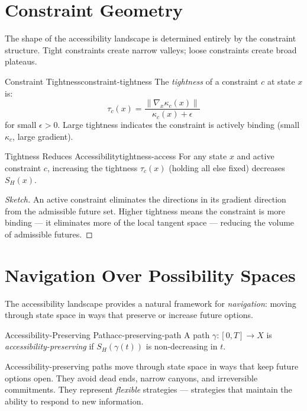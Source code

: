 \section{Constraint Geometry}

The shape of the accessibility landscape is determined entirely by the
constraint structure. Tight constraints create narrow valleys; loose
constraints create broad plateaus.

\begin{definition}{Constraint Tightness}{constraint-tightness}
  The \emph{tightness} of a constraint $c$ at state $x$ is:
  \[
    \tau_c(x) = \frac{\|\nabla_x \kappa_c(x)\|}{\kappa_c(x) + \epsilon}
  \]
  for small $\epsilon > 0$. Large tightness indicates the constraint is
  actively binding (small $\kappa_c$, large gradient).
\end{definition}

\begin{proposition}{Tightness Reduces Accessibility}{tightness-access}
  For any state $x$ and active constraint $c$, increasing the tightness
  $\tau_c(x)$ (holding all else fixed) decreases $S_H(x)$.
\end{proposition}

\begin{proof}[Sketch]
  An active constraint eliminates the directions in its gradient direction
  from the admissible future set. Higher tightness means the constraint
  is more binding — it eliminates more of the local tangent space — reducing
  the volume of admissible futures.
\end{proof}

\section{Navigation Over Possibility Spaces}

The accessibility landscape provides a natural framework for \emph{navigation}:
moving through state space in ways that preserve or increase future options.

\begin{definition}{Accessibility-Preserving Path}{acc-preserving-path}
  A path $\gamma : [0,T] \to X$ is \emph{accessibility-preserving} if
  $S_H(\gamma(t))$ is non-decreasing in $t$.
\end{definition}

Accessibility-preserving paths move through state space in ways that
keep future options open. They avoid dead ends, narrow canyons, and
irreversible commitments. They represent \emph{flexible} strategies —
strategies that maintain the ability to respond to new information.

